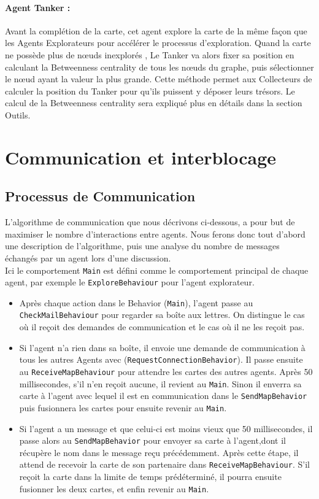 \documentclass[10pt]{article}
\newcommand\tab[1][0.65cm]{\hspace*{#1}}
\begin{document}
\paragraph{Agent Tanker :} Avant la complétion de la carte, cet agent explore la carte de la même façon que les Agents Explorateurs pour accélérer le processus d'exploration. Quand la carte ne possède plus de n\oe{}uds inexplorés , Le Tanker va alors fixer sa position en calculant la Betweenness centrality de tous les n\oe{}uds du graphe, puis sélectionner le n\oe{}ud ayant la valeur la plus grande. Cette méthode permet aux Collecteurs de calculer la position du Tanker pour qu'ils puissent y déposer leurs trésors. Le calcul de la Betweenness centrality sera expliqué plus en détails dans la section Outils.

\section{Communication et interblocage}

\subsection{Processus de Communication}
L'algorithme de communication que nous décrivons ci-dessous, a pour but de maximiser le nombre d'interactions entre agents. Nous ferons donc tout d'abord une description de l'algorithme, puis une analyse du nombre de messages échangés par un agent lors d'une discussion.\\
\linebreak   
\tab Ici le comportement \texttt{Main} est défini comme le comportement principal de chaque agent, par exemple le \texttt{ExploreBehaviour} pour l'agent explorateur.
\begin{itemize}
\item Après chaque action dans le Behavior (\texttt{Main}), l'agent passe au \texttt{CheckMailBehaviour} pour regarder sa boîte aux lettres. On distingue le cas où il reçoit des demandes de communication et le cas où il ne les reçoit pas.

\item Si l'agent n'a rien dans sa boîte, il envoie une demande de communication à tous les autres Agents avec (\texttt{RequestConnectionBehavior}). Il passe ensuite au \texttt{ReceiveMapBehaviour} pour attendre les cartes des autres agents. Après 50  millisecondes, s'il n'en reçoit aucune, il revient au \texttt{Main}. Sinon il enverra sa carte à l'agent avec lequel il est en communication dans le \texttt{SendMapBehavior} puis fusionnera les cartes pour ensuite revenir au \texttt{Main}.

\item Si l'agent a un message et que celui-ci est moins vieux que 50 millisecondes, il passe alors au \texttt{SendMapBehavior} pour envoyer sa carte à l'agent,dont il récupère le nom dans le message reçu précédemment. Après cette étape, il attend de recevoir la carte de son partenaire dans \texttt{ReceiveMapBehaviour}. S'il reçoit la carte dans la limite de temps prédéterminé, il pourra ensuite fusionner les deux cartes, et enfin revenir au \texttt{Main}.\\
\end{itemize}
\end{document}
